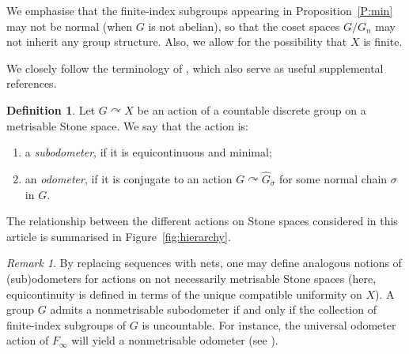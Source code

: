 \documentclass[11pt,a4,leqno]{amsart}
\theoremstyle{definition}
\newtheorem{df}[thm]{Definition}
\theoremstyle{remark}
\newtheorem{rem}[thm]{Remark}
\numberwithin{equation}{section}
\theoremstyle{plain}
\begin{document}
We emphasise that the finite-index subgroups appearing in Proposition~\ref{P:min} may not be normal (when $G$ is not abelian), so that the coset spaces $G/G_n$ may not inherit any group structure. Also, we allow for the possibility that $X$ is finite.  

We closely follow the terminology of \cite{CorPet08,CorMed16,CorHau26}, which also serve as useful supplemental references. 

\begin{df}\label{D:odometer}
    Let $G\curvearrowright X$ be an action of a countable discrete group on a metrisable Stone space. We say that the action is:
    \begin{enumerate}
        \item a \emph{subodometer}, if it is equicontinuous and minimal;
        \item an \emph{odometer}, if it is conjugate to an action $G\curvearrowright \widehat{G}_\sigma$ for some normal chain $\sigma$ in $G$. 
    \end{enumerate}
\end{df}

The relationship between the different actions on Stone spaces considered in this article is summarised in Figure~\ref{fig:hierarchy}. 

\begin{rem}
    By replacing sequences with nets, one may define analogous notions of (sub)odometers for actions on not necessarily metrisable Stone spaces (here, equicontinuity is defined in terms of the unique compatible uniformity on $X$). A group $G$ admits a nonmetrisable subodometer if and only if the collection of finite-index subgroups of $G$ is uncountable. For instance, the universal odometer action of $F_\infty$ will yield a nonmetrisable odometer (see \cite{CorHau26}).   
\end{rem}

\newif\ifHierarchyGreyscale
\HierarchyGreyscalefalse

\end{document}
